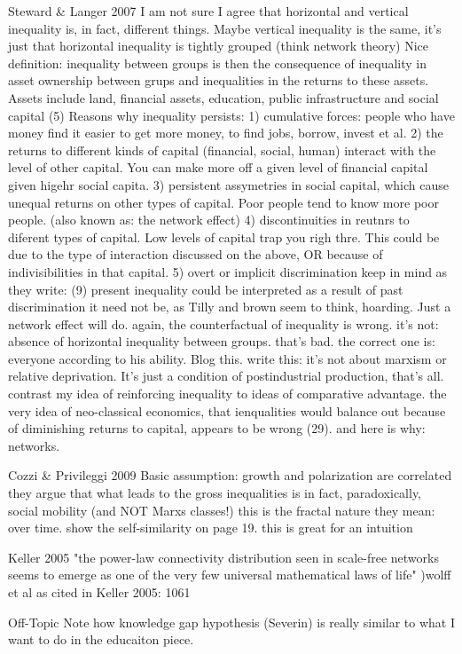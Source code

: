 Steward & Langer 2007
I am not sure I agree that horizontal and vertical inequality is, in fact, different things. Maybe vertical inequality is the same, it's just that horizontal inequality is tightly grouped (think network theory)
Nice definition: inequality between groups is then the consequence of inequality in asset ownership between grups and inequalities in the returns to these assets. Assets include land, financial assets, education, public infrastructure and social capital (5)
Reasons why inequality persists:
1) cumulative forces: people who have money find it easier to get more money, to find jobs, borrow, invest et al.
2) the returns to different kinds of capital (financial, social, human) interact with the level of other capital. You can make more off a given level of financial capital given higehr social capita.
3) persistent assymetries in social capital, which cause unequal returns on other types of capital. Poor people tend to know more poor people. (also known as: the network effect)
4) discontinuities in reutnrs to diferent types of capital. Low levels of capital trap you righ thre. This could be due to the type of interaction discussed on the above, OR because of indivisibilities in that capital.
5) overt or implicit discrimination
keep in mind as they write: (9) present inequality could be interpreted as a result of past discrimination
it need not be, as Tilly and brown seem to think, hoarding. Just a network effect will do.
again, the counterfactual of inequality is wrong. it's not: absence of horizontal inequality between groups. that's bad. the correct one is: everyone according to his ability. Blog this.
write this: it's not about marxism or relative deprivation. It's just a condition of postindustrial production, that's all.
contrast my idea of reinforcing inequality to ideas of comparative advantage.
the very idea of neo-classical economics, that ienqualities would balance out because of diminishing returns to capital, appears to be wrong (29). and here is why: networks. 

Cozzi & Privileggi 2009
Basic assumption: growth and polarization are correlated
they argue that what leads to the gross inequalities is in fact, paradoxically, social mobility (and NOT Marxs classes!)
this is the fractal nature they mean: over time.
 show the self-similarity on page 19. this is great for an intuition

Keller 2005
"the power-law connectivity distribution seen in scale-free networks seems to emerge as one of the very few universal mathematical laws of life" )wolff et al as cited in Keller 2005: 1061




Off-Topic
Note how knowledge gap hypothesis (Severin) is really similar to what I want to do in the educaiton piece.

